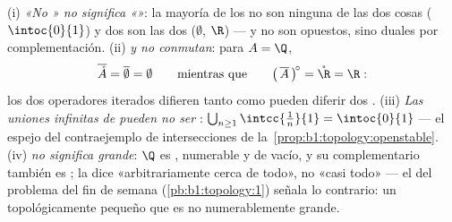 \begin{remark}
(i) \emph{«No » no significa «»}: la mayoría de los
 no son ninguna de las dos cosas ($\intoc{0}{1}$) y dos son
las dos ($\emptyset$, $\R$) ---  y  no son opuestos,
sino duales por complementación. (ii) \emph{ y  no
conmutan}: para $A = \Q$,
\[
\overline{\mathring A} = \overline\emptyset = \emptyset
\qquad\text{mientras que}\qquad
\bigl(\,\overline A\,\bigr)^{\!\circ} = \mathring \R = \R :
\]
los dos operadores iterados difieren tanto como pueden diferir dos
. (iii) \emph{Las uniones infinitas de  pueden no
ser }: $\bigcup_{n\geq1} \intcc{\frac1n}{1} = \intoc{0}{1}$
--- el espejo del contraejemplo de intersecciones de
la~\cref{prop:b1:topology:openstable}. (iv) \emph{ no significa
grande}: $\Q$ es , numerable y de  vacío, y su
complementario también es ; la  dice «arbitrariamente
cerca de todo», no «casi todo» --- el  del problema
del fin de semana (\cref{pb:b1:topology:1}) señala lo contrario: un
 topológicamente pequeño que es no numerablemente grande.
\end{remark}


